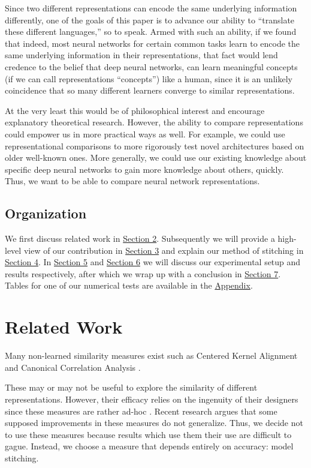 \documentclass{article} %
\begin{document}
Since two different representations can encode the same underlying information differently, one of the goals of this
paper is to advance our ability to ``translate these different languages,'' so to speak. Armed with such an ability,
if we found that indeed, most neural networks for certain
common tasks learn to encode the same
underlying information in their representations, that fact would lend credence to the belief that deep neural
networks, can learn meaningful concepts (if we can call representations ``concepts'')
like a human, since it is an unlikely coincidence that so many
different learners converge to similar representations.

At the very least this would be of philosophical interest and encourage explanatory theoretical research.
However, the ability to compare representations could empower us in more practical ways as well.
For example, we could use representational comparisons
to more rigorously test novel architectures based on older well-known ones. More generally, we could
use our existing knowledge about specific deep neural networks to gain more knowledge about others, quickly.
Thus, we want to be able to compare neural network representations.

\subsection*{Organization}
We first discuss related work in \hyperref[RelatedWork]{Section 2}. Subsequently we will provide a high-level view of our
contribution in \hyperref[Contribution]{Section 3} and explain our method of stitching in \hyperref[Stitching]{Section 4}.
In \hyperref[ExperimentalSetup]{Section 5} and \hyperref[Results]{Section 6} we will discuss our experimental setup and
results respectively, after which we wrap up with a conclusion in \hyperref[Conclusion]{Section 7}. Tables for one of
our numerical tests are available in the \hyperref[Appendix]{Appendix}.

\section{Related Work}
\label{RelatedWork}
Many non-learned similarity measures exist such as Centered Kernel Alignment \cite{Kornblith2019SimilarityON} and
Canonical Correlation Analysis \cite{Morcos2018InsightsOR}.

These may or may not be useful to explore the similarity of different representations. However, their efficacy relies
on the ingenuity of their designers since these measures are rather ad-hoc \cite{Bansal2021RevisitingMS}.
Recent research \cite{Ding2021GroundingRS} argues that some supposed improvements in these measures do not generalize.
Thus, we decide not to use these measures because results which use them their use are difficult to gague.
Instead, we choose a measure that depends entirely on accuracy: model stitching.
\end{document}
